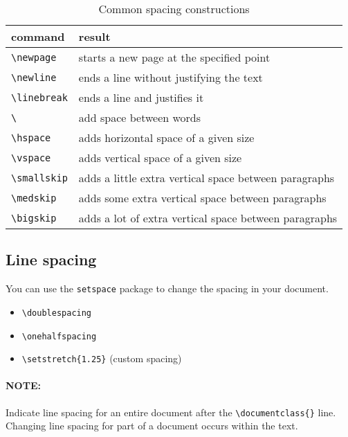 \documentclass[11pt]{article}
\begin{document}
\begin{table}[htbp]
  \centering
  \caption{Common spacing constructions}
    \begin{tabular}{ll}
    \toprule
    command & result \\
    \midrule
    \verb|\newpage| & starts a new page at the specified point \\
    \verb|\newline| & ends a line without justifying the text \\
    \verb|\linebreak| & ends a line and justifies it \\
    \verb|\ | &  add space between words\\
    \verb|\hspace| & adds horizontal space of a given size \\
    \verb|\vspace| & adds vertical space of a given size\\
    \verb|\smallskip| & adds a little extra vertical space between paragraphs \\
    \verb|\medskip| & adds some extra vertical space between paragraphs \\
    \verb|\bigskip| & adds a lot of extra vertical space between paragraphs \\
    \bottomrule
    \end{tabular}%
  \label{tab:spacing}%
\end{table}%

\subsection*{Line spacing}

You can use the \verb|setspace| package to change the spacing in your document.

\begin{itemize}[noitemsep]
    \item \verb|\doublespacing|
    \item \verb|\onehalfspacing|
    \item \verb|\setstretch{1.25}| (custom spacing)
\end{itemize}

\paragraph{NOTE:} Indicate line spacing for an entire document after the \verb|\documentclass{}| line. Changing line spacing for part of a document occurs within the text.
\end{document}
